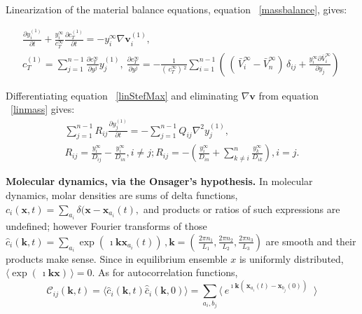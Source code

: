 \documentclass[../main.tex]{subfiles}
\begin{document}
Linearization of the material balance equations, equation ~\ref{massbalance},  gives:

\begin{equation}\begin{array}{l}
    \displaystyle \frac{\partial  y_i^{(1)}}{\partial t} + \frac{ y_i^{\infty}}{c_T^{\infty} } \frac{\partial  c_T^{(1)}}{\partial t} = - y_i^{\infty}  \nabla \mathbf{v}_i^{(1)},
    \label{linmass}
\\
     c_T^{(1)}  =    \displaystyle \sum_{j=1}^{n-1} \frac{\partial c_T^{\infty}}{\partial y^j} y_j^{(1)},
     \ \frac{\partial c_T^{\infty}}{\partial y^j} = -\frac{1}{( \, c_T^{\infty}) \,^2}  \sum_{i=1}^{n-1} ( \, ( \,  \bar{V}_i^{\infty} - \bar{V}_n^{\infty} ) \,  \delta_{ij} +
    \frac{ y_i^{\infty}\partial  \bar{V}_i^{\infty} }{\partial  y_j}) \,

\end{array} \end{equation}

Differentiating equation ~\ref{linStefMax} and eliminating $\nabla \mathbf{v}$ from equation ~\ref{linmass} gives:
\begin{equation} \begin{array}{l}
     \sum_{j=1}^{n-1} R_{ij} \frac{\partial  y_j^{(1)}}{\partial t}= - \sum_{j=1}^{n-1} Q_{ij} \nabla^2 y_j^{(1)},
    \label{eq:y1}
\\
     R_{ij} =   \frac{ y_i^{\infty}}{D_{ij}} - \frac{ y_i^{\infty}}{D_{in}}, i\neq j;
   R_{ij}  =
- (   \frac{ y_i^{\infty}}{D_{in}} + \sum_{k\neq i}^{n} \frac{ y_k^{\infty}}{D_{ik}}   ), i =j.
\end{array} \end{equation}



\textbf{Molecular dynamics, via the Onsager's hypothesis.}
In molecular dynamics, molar densities are sums of delta functions, $ c_i (\mathbf{x},t) = \displaystyle \sum_{a_i} \delta (\mathbf{x}- \mathbf{x}_{a_i}(t),$ and products or ratios of such expressions are undefined; however  Fourier transforms of those $ \hat{c}_i (\mathbf{k},t) =  \sum_{a_i} \exp ( \, \imath \mathbf{k} \mathbf{x}_{a_i}(t) ) \, , \mathbf{k} = ( \,  \frac{2 \pi n_1}{L_1},  \frac{2 \pi n_2}{L_2}, \frac{2 \pi n_3}{L_3} ) $ are smooth and their products make sense. Since in equilibrium ensemble $x$ is uniformly distributed, $\langle \exp(\,\imath\mathbf{k}\mathbf{x})\,\rangle=0$. As for autocorrelation functions,
\begin{equation}
    \mathcal{C}_{ij}(\mathbf{k},t )= \langle \hat{c}_i (\mathbf{k},t)  \hat{\bar{c}}_i (\mathbf{k},0) \rangle = \displaystyle\sum_{a_i,b_j} \langle \ e^{  \imath \mathbf{k} ( \,  \mathbf{x}_{a_i}(t)-\mathbf{x}_{b_j}(0) ) \,  }\ \  \rangle
\end{equation}
\end{document}
